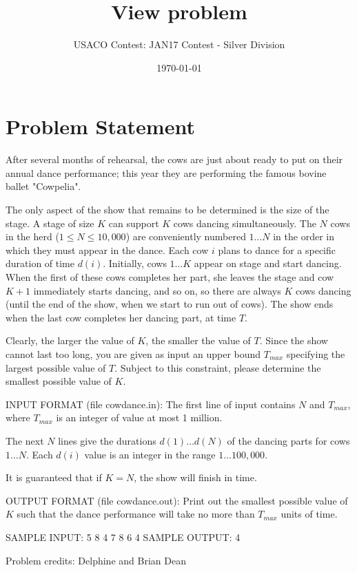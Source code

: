\documentclass[12pt]{article}
\title{View problem}
\author{USACO Contest: JAN17 Contest - Silver Division}
\date{\today}
\begin{document}
\maketitle

\section*{Problem Statement}

After several months of rehearsal, the cows are just about ready to put  on
their annual dance performance; this year they are performing the famous bovine ballet
"Cowpelia".

The only aspect of the show that remains to be determined is the size of the
stage.  A stage of size $K$ can support $K$ cows dancing simultaneously.   The
$N$ cows in the herd ($1 \leq N \leq 10,000$) are conveniently  numbered
$1 \ldots N$ in the order in which they must appear in the  dance.  Each cow $i$
plans to dance for a specific duration of time $d(i)$.  Initially, cows
$1 \ldots K$ appear on stage and start dancing.  When the first of these cows
completes her part, she leaves the stage and cow $K+1$ immediately starts
dancing, and so on, so there are always $K$ cows dancing (until the end of the
show, when we start to run out of cows).  The show ends when the last cow
completes  her dancing part, at time $T$.

Clearly, the larger the value of $K$, the smaller the value of $T$. Since the
show cannot last too long, you are given as input an upper bound $T_{max}$
specifying the largest possible value of $T$.  Subject to this constraint,
please determine the smallest possible value of $K$.

INPUT FORMAT (file cowdance.in):
The first line of input contains $N$ and $T_{max}$, where $T_{max}$ is an
integer of value at most 1 million.

The next $N$ lines give the durations $d(1) \ldots d(N)$ of the dancing parts
for cows $1 \ldots N$.  Each $d(i)$ value is an integer in the range
$1 \ldots 100,000$.

It is guaranteed that if $K=N$, the show will finish in time.

OUTPUT FORMAT (file cowdance.out):
Print out the smallest possible value of $K$ such that the dance performance
will take no more than $T_{max}$ units of time.

SAMPLE INPUT:
5 8
4
7
8
6
4
SAMPLE OUTPUT: 
4


Problem credits: Delphine and Brian Dean
\end{document}
